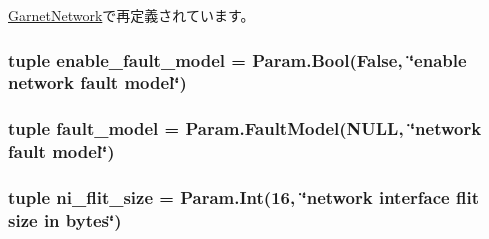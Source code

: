 \hyperlink{classGarnetNetwork_1_1GarnetNetwork_a17da7064bc5c518791f0c891eff05fda}{GarnetNetwork}で再定義されています。\hypertarget{classBaseGarnetNetwork_1_1BaseGarnetNetwork_acad5e3407be72b05938ce07227ebd49c}{
\subsubsection[{enable\_\-fault\_\-model}]{\setlength{\rightskip}{0pt plus 5cm}tuple {\bf enable\_\-fault\_\-model} = Param.Bool(False, \char`\"{}enable network fault model\char`\"{})}}
\label{classBaseGarnetNetwork_1_1BaseGarnetNetwork_acad5e3407be72b05938ce07227ebd49c}
\hypertarget{classBaseGarnetNetwork_1_1BaseGarnetNetwork_a4d201916fdd647cf79775edd2612adce}{
\subsubsection[{fault\_\-model}]{\setlength{\rightskip}{0pt plus 5cm}tuple {\bf fault\_\-model} = Param.FaultModel(NULL, \char`\"{}network fault model\char`\"{})}}
\label{classBaseGarnetNetwork_1_1BaseGarnetNetwork_a4d201916fdd647cf79775edd2612adce}
\hypertarget{classBaseGarnetNetwork_1_1BaseGarnetNetwork_a0b76d8599630f795ff97703fe84ff7d9}{
\subsubsection[{ni\_\-flit\_\-size}]{\setlength{\rightskip}{0pt plus 5cm}tuple {\bf ni\_\-flit\_\-size} = Param.Int(16, \char`\"{}network interface {\bf flit} size in bytes\char`\"{})}}
